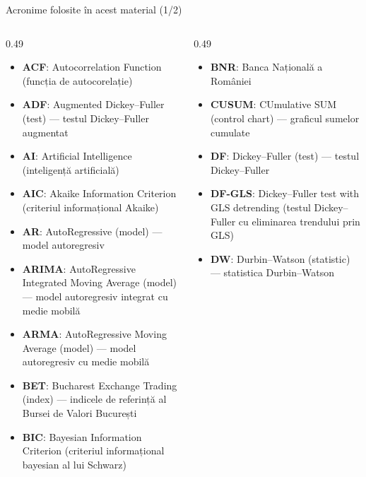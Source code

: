 {
\begin{frame}[noframenumbering]
    \titlepage
\end{frame}
}
\begin{frame}{Acronime folosite în acest material (1/2)}
\begin{columns}[T]
\begin{column}{0.49\textwidth}
\begin{itemize}\setlength{\itemsep}{0pt}
    \item \textbf{ACF}: Autocorrelation Function (funcția de autocorelație)
    \item \textbf{ADF}: Augmented Dickey–Fuller (test) — testul Dickey–Fuller augmentat
    \item \textbf{AI}: Artificial Intelligence (inteligență artificială)
    \item \textbf{AIC}: Akaike Information Criterion (criteriul informațional Akaike)
    \item \textbf{AR}: AutoRegressive (model) — model autoregresiv
    \item \textbf{ARIMA}: AutoRegressive Integrated Moving Average (model) — model autoregresiv integrat cu medie mobilă
    \item \textbf{ARMA}: AutoRegressive Moving Average (model) — model autoregresiv cu medie mobilă
    \item \textbf{BET}: Bucharest Exchange Trading (index) — indicele de referință al Bursei de Valori București
    \item \textbf{BIC}: Bayesian Information Criterion (criteriul informațional bayesian al lui Schwarz)
\end{itemize}
\end{column}
\begin{column}{0.49\textwidth}
\begin{itemize}\setlength{\itemsep}{0pt}
    \item \textbf{BNR}: Banca Națională a României
    \item \textbf{CUSUM}: CUmulative SUM (control chart) — graficul sumelor cumulate
    \item \textbf{DF}: Dickey–Fuller (test) — testul Dickey–Fuller
    \item \textbf{DF-GLS}: Dickey–Fuller test with GLS detrending (testul Dickey–Fuller cu eliminarea trendului prin GLS)
    \item \textbf{DW}: Durbin–Watson (statistic) — statistica Durbin–Watson

\end{itemize}
\end{column}
\end{columns}
\end{frame}
